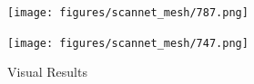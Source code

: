 \newpage
\begin{figure}
\begin{minipage}{\textwidth}
  \centerline{\texttt{[image: figures/scannet\_mesh/787.png]}}
\end{minipage}
\vfill
\begin{minipage}{\linewidth}
  \centerline{\texttt{[image: figures/scannet\_mesh/747.png]}}
\end{minipage}

\label{fig:scannet_supp}
    \caption{Visual Results}
\end{figure}
